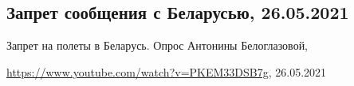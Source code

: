  
 
 
 
 
\subsection{Запрет сообщения с Беларусью, 26.05.2021}
\label{sec:stranaua.oprosy_beloglazova.26_05_2021.kiev.belarus_zapret_aviacia}

Запрет на полеты в Беларусь. Опрос Антонины Белоглазовой,\par
\url{https://www.youtube.com/watch?v=PKEM33DSB7g}, 26.05.2021

